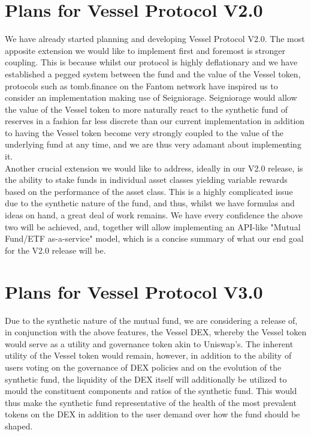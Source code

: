 \documentclass[letterpaper,11pt]{article}
\begin{document}
\section{Plans for Vessel Protocol V2.0}
We have already started planning and developing Vessel Protocol V2.0. The most apposite extension we would like to implement first and foremost is stronger coupling. This is because whilst our protocol is highly deflationary and we have established a pegged system between the fund and the value of the Vessel token, protocols such as tomb.finance on the Fantom network have inspired us to consider an implementation making use of Seigniorage. Seigniorage would allow the value of the Vessel token to more naturally react to the synthetic fund of reserves in a fashion far less discrete than our current implementation in addition to having the Vessel token become very strongly coupled to the value of the underlying fund at any time, and we are thus very adamant about implementing it. \\

Another crucial extension we would like to address, ideally in our V2.0 release, is the ability to stake funds in individual asset classes yielding variable rewards based on the performance of the asset class. This is a highly complicated issue due to the synthetic nature of the fund, and thus, whilst we have formulas and ideas on hand, a great deal of work remains. We have every confidence the above two will be achieved, and, together will allow implementing an API-like "Mutual Fund/ETF as-a-service" model, which is a concise summary of what our end goal for the V2.0 release will be.


\section{Plans for Vessel Protocol V3.0}
Due to the synthetic nature of the mutual fund, we are considering a release of, in conjunction with the above features, the Vessel DEX, whereby the Vessel token would serve as a utility and governance token akin to Uniswap’s. The inherent utility of the Vessel token would remain, however, in addition to the ability of users voting on the governance of DEX policies and on the evolution of the synthetic fund, the liquidity of the DEX itself will additionally be utilized to mould the constituent components and ratios of the synthetic fund. This would thus make the synthetic fund representative of the health of the most prevalent tokens on the DEX in addition to the user demand over how the fund should be shaped. 
\end{document}
